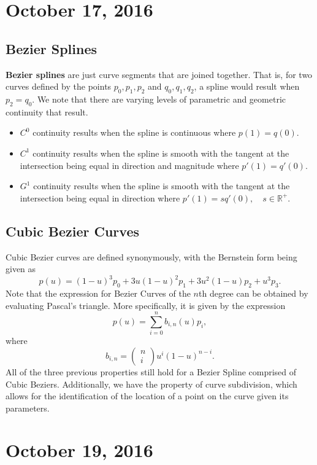 \documentclass[11pt]{article}
\theoremstyle{plain} %
\theoremstyle{definition}
\theoremstyle{example}
\theoremstyle{remark}
\begin{document}
\section{October 17, 2016}
\subsection{Bezier Splines}

\textbf{Bezier splines} are just curve segments that are joined together. That is, for two curves defined by the points $p_0, p_1, p_2$ and $q_0, q_1, q_2$, a spline would result when $p_2 = q_0$. We note that there are varying levels of parametric and geometric continuity that result. 

\begin{itemize}
	\item $C^0$ continuity results when the spline is continuous where $p(1) = q(0)$.
	\item $C^1$ continuity results when the spline is smooth with the tangent at the intersection being equal in direction and magnitude where $p'(1) = q'(0)$.
	\item $G^1$ continuity results when the spline is smooth with the tangent at the intersection being equal in direction where $p'(1) = sq'(0), \quad s \in \mathbb R^+$.
\end{itemize}

\subsection{Cubic Bezier Curves}

Cubic Bezier curves are defined synonymously, with the Bernstein form being given as 
$$p(u) = (1-u)^3p_0 + 3u(1-u)^2p_1 + 3u^2(1-u)p_2 + u^3p_3.$$
Note that the expression for Bezier Curves of the $n$th degree can be obtained by evaluating Pascal's triangle. More specifically, it is given by the expression 
$$p(u) = \sum_{i=0}^nb_{i,n}(u)p_i,$$ where $$b_{i,n} = \begin{pmatrix}n\\i\end{pmatrix}u^i(1-u)^{n-i}.$$
All of the three previous properties still hold for a Bezier Spline comprised of Cubic Beziers. Additionally, we have the property of curve subdivision, which allows for the identification of the location of a point on the curve given its parameters. 


\section{October 19, 2016}
\end{document}
